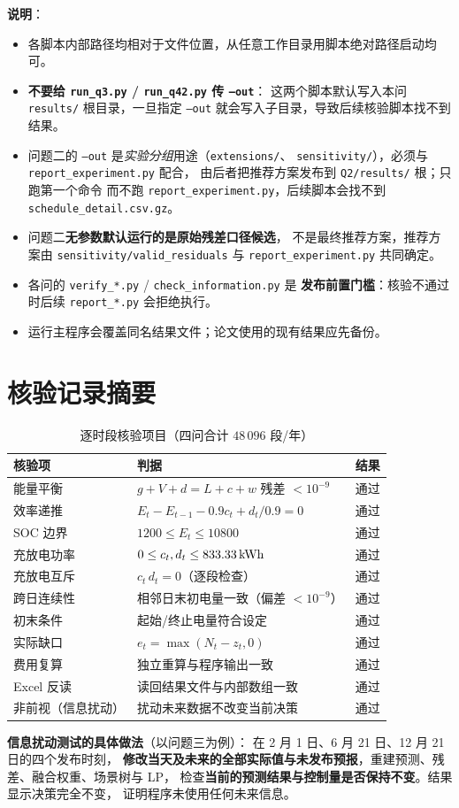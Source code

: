 \textbf{说明}：
\begin{itemize}[itemsep=2pt,topsep=3pt]
  \item 各脚本内部路径均相对于文件位置，从任意工作目录用脚本绝对路径启动均可。
  \item \textbf{不要给 \texttt{run\_q3.py} / \texttt{run\_q42.py} 传 \texttt{--out}}：
        这两个脚本默认写入本问 \texttt{results/} 根目录，一旦指定 \texttt{--out}
        就会写入子目录，导致后续核验脚本找不到结果。
  \item 问题二的 \texttt{--out} 是\emph{实验分组}用途（\texttt{extensions/}、
        \texttt{sensitivity/}），必须与 \texttt{report\_experiment.py} 配合，
        由后者把推荐方案发布到 \texttt{Q2/results/} 根；只跑第一个命令
        而不跑 \texttt{report\_experiment.py}，后续脚本会找不到
        \texttt{schedule\_detail.csv.gz}。
  \item 问题二\textbf{无参数默认运行的是原始残差口径候选}，
        不是最终推荐方案，推荐方案由 \texttt{sensitivity/valid\_residuals} 与
        \texttt{report\_experiment.py} 共同确定。
  \item 各问的 \texttt{verify\_*.py} / \texttt{check\_information.py} 是
        \textbf{发布前置门槛}：核验不通过时后续 \texttt{report\_*.py} 会拒绝执行。
  \item 运行主程序会覆盖同名结果文件；论文使用的现有结果应先备份。
\end{itemize}

\section{核验记录摘要}

\begin{table}[H]
\centering
\caption{逐时段核验项目（四问合计 $48\,096$ 段/年）}
\small
\begin{tabular}{@{}l l c@{}}
\toprule
核验项 & 判据 & 结果 \\
\midrule
能量平衡            & $g+V+d=L+c+w$ 残差 $<10^{-9}$ & 通过 \\
效率递推            & $E_t-E_{t-1}-0.9c_t+d_t/0.9=0$ & 通过 \\
SOC 边界            & $1200\le E_t\le10800$ & 通过 \\
充放电功率          & $0\le c_t,d_t\le 833.33\,\text{kWh}$ & 通过 \\
充放电互斥          & $c_t\,d_t=0$（逐段检查）& 通过 \\
跨日连续性          & 相邻日末初电量一致（偏差 $<10^{-9}$）& 通过 \\
初末条件            & 起始/终止电量符合设定 & 通过 \\
实际缺口            & $e_t=\max(N_t-z_t,0)$ & 通过 \\
费用复算            & 独立重算与程序输出一致 & 通过 \\
Excel 反读          & 读回结果文件与内部数组一致 & 通过 \\
非前视（信息扰动）  & 扰动未来数据不改变当前决策 & 通过 \\
\bottomrule
\end{tabular}
\end{table}

\textbf{信息扰动测试的具体做法}（以问题三为例）：
在 2 月 1 日、6 月 21 日、12 月 21 日的四个发布时刻，
\textbf{修改当天及未来的全部实际值与未发布预报}，重建预测、残差、融合权重、场景树与 LP，
检查\textbf{当前的预测结果与控制量是否保持不变}。结果显示决策完全不变，
证明程序未使用任何未来信息。




